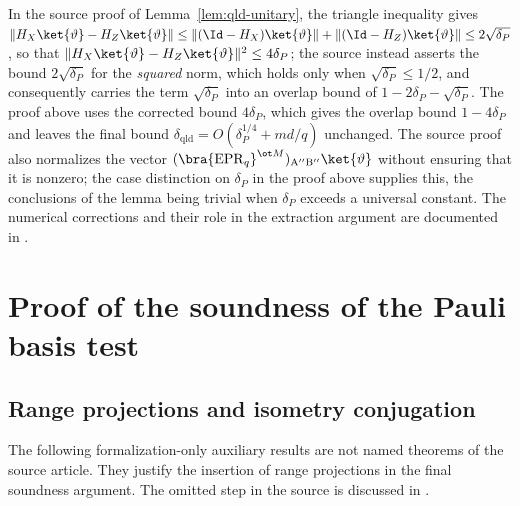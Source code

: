 \begin{remark}\label{rem:qld-unitary-triangle-slip}
	In the source proof of Lemma~\ref{lem:qld-unitary}, the triangle inequality gives $\| H_X \ket{\vartheta} - H_Z \ket{\vartheta} \| \leq \| (\Id - H_X)\ket{\vartheta} \| + \| (\Id - H_Z)\ket{\vartheta} \| \leq 2\sqrt{\delta_P}$, so that $\| H_X \ket{\vartheta} - H_Z \ket{\vartheta} \|^2 \leq 4\delta_P$; the source instead asserts the bound $2\sqrt{\delta_P}$ for the \emph{squared} norm, which holds only when $\sqrt{\delta_P} \leq 1/2$, and consequently carries the term $\sqrt{\delta_P}$ into an overlap bound of $1 - 2\delta_P - \sqrt{\delta_P}$. The proof above uses the corrected bound $4\delta_P$, which gives the overlap bound $1 - 4\delta_P$ and leaves the final bound $\delta_{\mathrm{qld}} = O(\delta_P^{1/4} + md/q)$ unchanged. The source proof also normalizes the vector $(\bra{\mathrm{EPR}_q}^{\ot M})_{\mathrm{A}''\mathrm{B}''} \ket{\vartheta}$ without ensuring that it is nonzero; the case distinction on $\delta_P$ in the proof above supplies this, the conclusions of the lemma being trivial when $\delta_P$ exceeds a universal constant.
	The numerical corrections and their role in the extraction argument are
	documented in \cite{gap:qpbt_extraction-transfer}.
\end{remark}

\section{Proof of the soundness of the Pauli basis test}

\subsection{Range projections and isometry conjugation}

The following formalization-only auxiliary results are not named theorems of
the source article. They justify the insertion of range projections in the
final soundness argument. The omitted step in the source is discussed in
\cite{gap:qpbt_extraction-transfer}.


